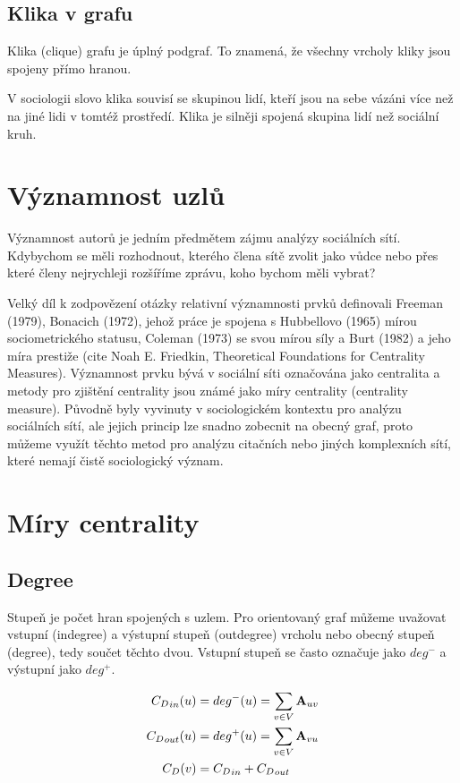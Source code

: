 \documentclass[12pt,titlepage]{report}
\begin{document}
\subsection{Klika v grafu}
Klika (clique) grafu je úplný podgraf. To znamená, že všechny vrcholy kliky
jsou spojeny přímo hranou.

V sociologii slovo klika souvisí se skupinou lidí, kteří jsou na sebe vázáni
více než na jiné lidi v tomtéž prostředí. Klika je silněji spojená skupina lidí
než sociální kruh.

\section{Významnost uzlů}
Významnost autorů je jedním předmětem zájmu analýzy sociálních sítí. Kdybychom
se měli rozhodnout, kterého člena sítě zvolit jako vůdce nebo přes které členy
nejrychleji rozšíříme zprávu, koho bychom měli vybrat? 

Velký díl k zodpovězení otázky relativní významnosti prvků definovali Freeman
(1979), Bonacich (1972), jehož práce je spojena s Hubbellovo (1965) mírou
sociometrického statusu, Coleman (1973) se svou mírou síly a Burt (1982) a jeho
míra prestiže (cite Noah E. Friedkin, Theoretical Foundations for Centrality Measures). Významnost prvku bývá v sociální síti označována jako centralita
a metody pro zjištění centrality jsou známé jako míry centrality (centrality
measure). Původně byly vyvinuty v sociologickém kontextu pro analýzu sociálních
sítí, ale jejich princip lze snadno zobecnit na obecný graf, proto můžeme
využít těchto metod pro analýzu citačních nebo jiných komplexních sítí, které
nemají čistě sociologický význam.

\section{Míry centrality}
\subsection{Degree}
Stupeň je počet hran spojených s uzlem. Pro orientovaný graf můžeme uvažovat
vstupní (indegree) a výstupní stupeň (outdegree) vrcholu nebo obecný stupeň
(degree), tedy součet těchto dvou.  Vstupní stupeň se často označuje jako
$deg^-$ a výstupní jako $deg^+$. 

\begin{align}
\label{eq:degree}
{C_D}_{in}(u) &= deg^-(u)  = \displaystyle\sum\limits_{v \in V} {\bf A}_{uv} \\
{C_D}_{out}(u) &= deg^+(u) = \displaystyle\sum\limits_{v \in V} {\bf A}_{vu} \\
{C_D}(v) &= {C_D}_{in} + {C_D}_{out}
\end{align}
\end{document}
